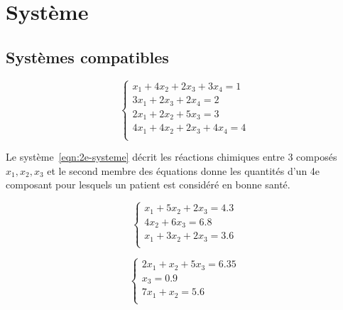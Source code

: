 \documentclass[a4paper]{article}\usepackage[]{graphicx}\usepackage[]{xcolor}
\begin{document}
\section*{Système}

\vspace{0,75cm}

\subsection*{Systèmes compatibles}



\begin{equation}
    \begin{cases} x_1 + 4x_2 + 2x_3 + 3x_4  =  1 \\ 3x_1 + 2x_3 + 2x_4  =  2 \\ 2x_1 + 2x_2 + 5x_3  =  3 \\ 4x_1 + 4x_2 + 2x_3 + 4x_4  =  4 \\ \end{cases}
    \label{eqn:1e-systeme}
\end{equation}

Le système~\ref{eqn:2e-systeme} décrit les réactions chimiques entre 3 composés $x_1, x_2, x_3$ et le
second membre des équations donne les quantités d'un 4e composant pour lesquels 
un patient est considéré en bonne santé. 

\noindent\begin{minipage}{.5\linewidth}


\begin{equation}
    \begin{cases} x_1 + 5x_2 + 2x_3  =  4.3 \\ 4x_2 + 6x_3  =  6.8 \\ x_1 + 3x_2 + 2x_3  =  3.6 \\ \end{cases}
    \label{eqn:2e-systeme}
\end{equation}
\end{minipage}
\begin{minipage}{.5\linewidth}


\begin{equation}
    \begin{cases} 2x_1 + x_2 + 5x_3  =  6.35 \\ x_3  =  0.9 \\ 7x_1 + x_2  =  5.6 \\ \end{cases}
    \label{eqn:3e-systeme}
\end{equation}
\end{minipage}
\end{document}
